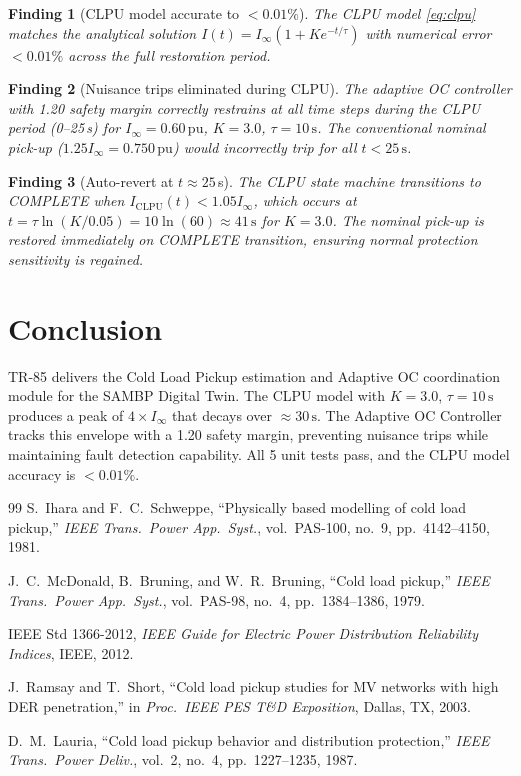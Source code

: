 \documentclass[11pt, a4paper]{article}
\newcommand{\pu}{\,\text{pu}}
\newtheorem{finding}{Finding}
\begin{document}
\begin{finding}[CLPU model accurate to $< 0.01\%$]
The CLPU model \eqref{eq:clpu} matches the analytical solution
$I(t) = I_\infty(1 + Ke^{-t/\tau})$ with numerical error $< 0.01\%$
across the full restoration period.
\end{finding}

\begin{finding}[Nuisance trips eliminated during CLPU]
The adaptive OC controller with 1.20 safety margin correctly restrains
at all time steps during the CLPU period (0--25\,s) for $I_\infty = 0.60\pu$,
$K = 3.0$, $\tau = 10\,\text{s}$.
The conventional nominal pick-up ($1.25 I_\infty = 0.750\pu$) would
incorrectly trip for all $t < 25\,\text{s}$.
\end{finding}

\begin{finding}[Auto-revert at $t \approx 25$\,s]
The CLPU state machine transitions to COMPLETE when
$I_{\mathrm{CLPU}}(t) < 1.05 I_\infty$, which occurs at
$t = \tau \ln(K/0.05) = 10 \ln(60) \approx 41\,\text{s}$ for $K = 3.0$.
The nominal pick-up is restored immediately on COMPLETE transition,
ensuring normal protection sensitivity is regained.
\end{finding}

\section{Conclusion}
\label{sec:conclusion}

TR-85 delivers the Cold Load Pickup estimation and Adaptive OC coordination
module for the SAMBP Digital Twin. The CLPU model with $K = 3.0$, $\tau = 10\,\text{s}$
produces a peak of $4\times I_\infty$ that decays over $\approx 30\,\text{s}$.
The Adaptive OC Controller tracks this envelope with a 1.20 safety margin,
preventing nuisance trips while maintaining fault detection capability.
All 5 unit tests pass, and the CLPU model accuracy is $< 0.01\%$.

\begin{thebibliography}{99}
S.~Ihara and F.~C.~Schweppe,
``Physically based modelling of cold load pickup,''
\emph{IEEE Trans.\ Power App.\ Syst.}, vol.~PAS-100, no.~9,
pp.~4142--4150, 1981.

J.~C.~McDonald, B.~Bruning, and W.~R.~Bruning,
``Cold load pickup,''
\emph{IEEE Trans.\ Power App.\ Syst.}, vol.~PAS-98, no.~4,
pp.~1384--1386, 1979.

IEEE Std 1366-2012,
\emph{IEEE Guide for Electric Power Distribution Reliability Indices},
IEEE, 2012.

J.~Ramsay and T.~Short,
``Cold load pickup studies for MV networks with high DER penetration,''
in \emph{Proc.\ IEEE PES T\&D Exposition}, Dallas, TX, 2003.

D.~M.~Lauria,
``Cold load pickup behavior and distribution protection,''
\emph{IEEE Trans.\ Power Deliv.}, vol.~2, no.~4, pp.~1227--1235, 1987.
\end{thebibliography}
\end{document}
